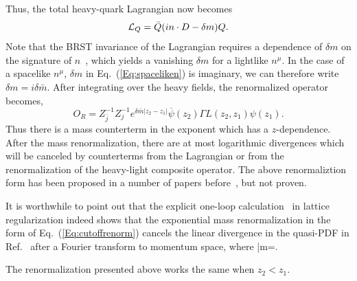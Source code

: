 Thus, the total heavy-quark Lagrangian now becomes
\begin{equation}\label{Eq:spaceliken}
    {\cal L}_Q = \bar Q (i n\cdot D-\delta m)Q.
\end{equation}
Note that the BRST invariance of the Lagrangian requires a dependence of $\delta m$ on the signature of $n$~\cite{Dorn:1986dt}, which yields a vanishing $\delta m$ for a lightlike $n^\mu$. In the case of a spacelike $n^\mu$, $\delta m$ in Eq.~(\ref{Eq:spaceliken}) is imaginary, we can therefore write $\delta m=i\delta {\bar m}$. After integrating over the heavy fields,  the renormalized operator becomes,
\begin{equation}\label{Eq:cutoffrenorm}
        O_R = Z_{\bar j}^{-1}Z_{j}^{-1}e^{\delta \bar m|z_2-z_1|}\overline{\psi}(z_2) \Gamma L(z_2,z_1)\psi(z_1).
\end{equation}
Thus there is a mass counterterm in the exponent which has a $z$-dependence.
After the mass renormalization, there are at most logarithmic divergences which will be canceled by counterterms from the Lagrangian or from the renormalization of the heavy-light composite operator. The above renormaliztion form has been proposed in a number of papers before~\cite{Musch:2010ka,Ishikawa:2016znu,Chen:2016fxx,Constantinou:2017sej,Alexandrou:2017huk,Chen:2017mzz},
but not proven.

It is worthwhile to point out that the explicit one-loop calculation~\cite{Chen:2016fxx} in lattice regularization indeed shows that the exponential mass renormalization in the form of Eq.~(\ref{Eq:cutoffrenorm}) cancels the linear divergence in the quasi-PDF in Ref.~\cite{Xiong:2013bka} after a Fourier transform to momentum space, where
\beq
\delta \bar m=.
\eeq

The renormalization presented above works the same when $z_2<z_1$.
